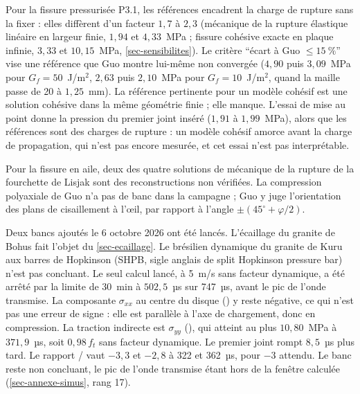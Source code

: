 Pour la fissure pressurisée P3.1, les références encadrent la charge de rupture sans la fixer : elles diffèrent d'un facteur $1{,}7$ à $2{,}3$ (mécanique de la rupture élastique linéaire en largeur finie, $1{,}94$ et $4{,}33$~MPa ; fissure cohésive exacte en plaque infinie, $3{,}33$ et $10{,}15$~MPa, \cref{sec-sensibilites}). Le critère \enquote{écart à Guo $\leq 15~\%$} vise une référence que Guo montre lui-même non convergée ($4{,}90$ puis $3{,}09$~MPa pour $G_f = 50$~J/m$^2$, $2{,}63$ puis $2{,}10$~MPa pour $G_f = 10$~J/m$^2$, quand la maille passe de 20 à $1{,}25$~mm). La référence pertinente pour un modèle cohésif est une solution cohésive dans la même géométrie finie ; elle manque. L'essai de mise au point donne la pression du premier joint inséré ($1{,}91$ à $1{,}99$~MPa), alors que les références sont des charges de rupture : un modèle cohésif amorce avant la charge de propagation, qui n'est pas encore mesurée, et cet essai n'est pas interprétable.

Pour la fissure en aile, deux des quatre solutions de mécanique de la rupture de la fourchette de Lisjak sont des reconstructions non vérifiées. La compression polyaxiale de Guo n'a pas de banc dans la campagne ; Guo y juge l'orientation des plans de cisaillement à l'œil, par rapport à l'angle $\pm(45^\circ + \varphi/2)$.

Deux bancs ajoutés le 6 octobre 2026 ont été lancés. L'écaillage du granite de Bohus fait l'objet du \cref{sec-ecaillage}. Le brésilien dynamique du granite de Kuru aux barres de Hopkinson (SHPB, sigle anglais de split Hopkinson pressure bar)~\cite{saksala2013bd} n'est pas concluant. Le seul calcul lancé, à 5~m/s sans facteur dynamique, a été arrêté par la limite de 30~min à $502{,}5$~µs sur 747~µs, avant le pic de l'onde transmise. La composante $\sigma_{xx}$ au centre du disque () y reste négative, ce qui n'est pas une erreur de signe : elle est parallèle à l'axe de chargement, donc en compression. La traction indirecte est $\sigma_{yy}$ (), qui atteint au plus $10{,}80$~MPa à $371{,}9$~µs, soit $0{,}98\,f_t$ sans facteur dynamique. Le premier joint rompt $8{,}5$~µs plus tard. Le rapport / vaut $-3{,}3$ et $-2{,}8$ à 322 et 362~µs, pour $-3$ attendu. Le banc reste non concluant, le pic de l'onde transmise étant hors de la fenêtre calculée (\cref{sec-annexe-simus}, rang 17).
